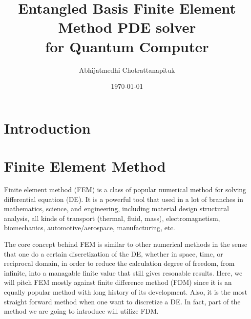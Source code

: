 \documentclass[preprint, 12pt]{revtex4-2}
\numberwithin{equation}{section}
\begin{document}
\title{Entangled Basis Finite Element Method PDE solver\\for Quantum Computer}

\author{Abhijatmedhi Chotrattanapituk}

\date{\today}

\maketitle

\section{Introduction}

\section{Finite Element Method}
Finite element method (FEM) is a class of popular numerical method for solving differential equation (DE). It is a powerful tool that used in a lot of branches in mathematics, science, and engineering, including material design structural analysis, all kinds of transport (thermal, fluid, mass), electromagnetism, biomechanics, automotive/aerospace, manufacturing, etc.

The core concept behind FEM is similar to other numerical methods in the sense that one do a certain discretization of the DE, whether in space, time, or reciprocal domain, in order to reduce the calculation degree of freedom, from infinite, into a managable finite value that still gives resonable results. Here, we will pitch FEM mostly against finite difference method (FDM) since it is an equally popular method with long history of its development. Also, it is the most straight forward method when one want to discretize a DE. In fact, part of the method we are going to introduce will utilize FDM.
\end{document}
